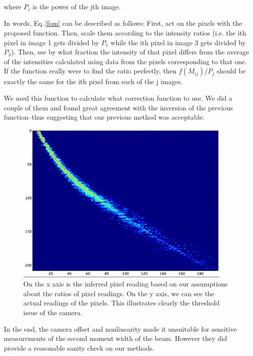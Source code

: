 where $P_j$ is the power of the jth image.

In words, Eq.\,\ref{fom} can be described as follows: First, act on the pixels with the proposed function. Then, scale them according to the intensity ratios (i.e. the ith pixel in image 1 gets divided by $P_1$ while the ith pixel in image 3 gets divided by $P_3$). Then, see by what fraction the intensity of that pixel differs from the average of the intensities calculated using data from the pixels corresponding to that one. If the function really were to find the ratio perfectly, then $f(M_{ij})/P_j$ should be exactly the same for the ith pixel from each of the j images. 


We used this function to calculate what correction function to use. We did a couple of them and found great agreement with the inversion of the previous function--thus suggesting that our previous method was acceptable. 


\begin{figure}
\centerline{
\includegraphics[width=0.95\textwidth]{cameraPixelFit}
}
\caption[Camera linearity and offset]{On the x axis is the inferred pixel reading based on our assumptions about the ratios of pixel readings. On the y axis, we can see the actual readings of the pixels. This illustrates clearly the threshold issue of the camera.}
\end{figure}

In the end, the camera offset and nonlinearity made it unsuitable for sensitive measurements of the second moment width of the beam. However they did provide a reasonable sanity check on our methods.
%
